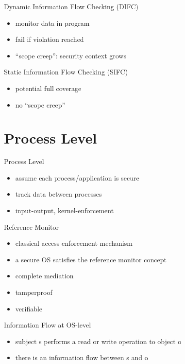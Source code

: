 \documentclass{curs}
\begin{document}
\begin{frame}{Dynamic Information Flow Checking (DIFC)}
  \begin{itemize}
    \item monitor data in program
    \item fail if violation reached
    \item ``scope creep'': security context grows
  \end{itemize}
\end{frame}

\begin{frame}{Static Information Flow Checking (SIFC)}
  \begin{itemize}
    \item potential full coverage
    \item no ``scope creep''
  \end{itemize}
\end{frame}

\section{Process Level}

\begin{frame}{Process Level}
  \begin{itemize}
    \item assume each process/application is secure
    \item track data between processes
    \item input-output, kernel-enforcement
  \end{itemize}
\end{frame}

\begin{frame}{Reference Monitor}
  \begin{itemize}
    \item classical access enforcement mechanism
    \item a secure OS satisfies the reference monitor concept
    \item complete mediation
    \item tamperproof
    \item verifiable
  \end{itemize}
\end{frame}

\begin{frame}{Information Flow at OS-level}
  \begin{itemize}
    \item subject s performs a read or write operation to object o
    \item there is an information flow between s and o
  \end{itemize}
\end{frame}
\end{document}
